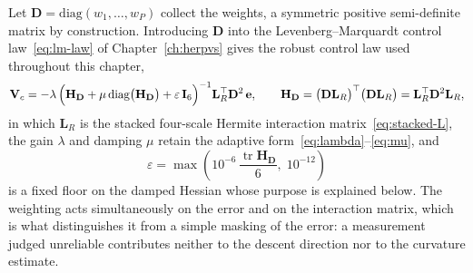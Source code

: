 Let $\mathbf{D}=\mathrm{diag}(w_{1},\dots,w_{P})$ collect the weights, a
symmetric positive semi-definite matrix by construction. Introducing
$\mathbf{D}$ into the Levenberg--Marquardt control law~\eqref{eq:lm-law} of
Chapter~\ref{ch:herpvs} gives the robust control law used throughout this
chapter,
\begin{equation}
    \mathbf{V}_{c}=-\lambda\,\Bigl(\mathbf{H}_{\mathbf{D}}
    +\mu\,\mathrm{diag}\bigl(\mathbf{H}_{\mathbf{D}}\bigr)
    +\varepsilon\,\mathbf{I}_{6}\Bigr)^{-1}
    \mathbf{L}_{R}^{\top}\mathbf{D}^{2}\,\mathbf{e},
    \qquad
    \mathbf{H}_{\mathbf{D}}=\bigl(\mathbf{D}\mathbf{L}_{R}\bigr)^{\top}
    \bigl(\mathbf{D}\mathbf{L}_{R}\bigr)
    =\mathbf{L}_{R}^{\top}\mathbf{D}^{2}\mathbf{L}_{R},
    \label{eq:robust-lm-law}
\end{equation}
in which $\mathbf{L}_{R}$ is the stacked four-scale Hermite interaction
matrix~\eqref{eq:stacked-L}, the gain $\lambda$ and damping $\mu$ retain the
adaptive form~\eqref{eq:lambda}--\eqref{eq:mu}, and
\begin{equation}
    \varepsilon=\max\!\left(10^{-6}\,\frac{\operatorname{tr}\mathbf{H}_{\mathbf{D}}}{6},
    \;10^{-12}\right)
    \label{eq:hessian-floor}
\end{equation}
is a fixed floor on the damped Hessian whose purpose is explained below. The
weighting acts simultaneously on the error and on the interaction matrix,
which is what distinguishes it from a simple masking of the error: a
measurement judged unreliable contributes neither to the descent direction nor
to the curvature estimate.

